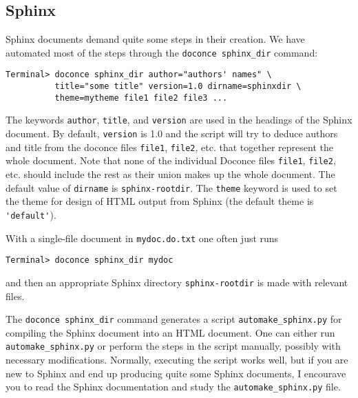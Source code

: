 \documentclass[%
oneside,                 %
final,                   %
10pt]{article}
\begin{document}
\noindent
\subsection{Sphinx}

Sphinx documents demand quite some steps in their creation. We have automated
most of the steps through the {\fontsize{10pt}{10pt}\Verb!doconce sphinx_dir!} command:
\vspace{4pt}
\begin{Verbatim}[numbers=none,frame=lines,label=\fbox{{\tiny Terminal}},fontsize=\fontsize{9pt}{9pt},
labelposition=topline,framesep=2.5mm,framerule=0.7pt]
Terminal> doconce sphinx_dir author="authors' names" \ 
          title="some title" version=1.0 dirname=sphinxdir \ 
          theme=mytheme file1 file2 file3 ...
\end{Verbatim}
The keywords {\fontsize{10pt}{10pt}\Verb!author!}, {\fontsize{10pt}{10pt}\Verb!title!}, and {\fontsize{10pt}{10pt}\Verb!version!} are used in the headings
of the Sphinx document. By default, {\fontsize{10pt}{10pt}\Verb!version!} is 1.0 and the script
will try to deduce authors and title from the doconce files {\fontsize{10pt}{10pt}\Verb!file1!},
{\fontsize{10pt}{10pt}\Verb!file2!}, etc. that together represent the whole document. Note that
none of the individual Doconce files {\fontsize{10pt}{10pt}\Verb!file1!}, {\fontsize{10pt}{10pt}\Verb!file2!}, etc. should
include the rest as their union makes up the whole document.
The default value of {\fontsize{10pt}{10pt}\Verb!dirname!} is {\fontsize{10pt}{10pt}\Verb!sphinx-rootdir!}. The {\fontsize{10pt}{10pt}\Verb!theme!}
keyword is used to set the theme for design of HTML output from
Sphinx (the default theme is {\fontsize{10pt}{10pt}\Verb!'default'!}).

With a single-file document in {\fontsize{10pt}{10pt}\Verb!mydoc.do.txt!} one often just runs
\vspace{4pt}
\begin{Verbatim}[numbers=none,frame=lines,label=\fbox{{\tiny Terminal}},fontsize=\fontsize{9pt}{9pt},
labelposition=topline,framesep=2.5mm,framerule=0.7pt]
Terminal> doconce sphinx_dir mydoc
\end{Verbatim}
and then an appropriate Sphinx directory {\fontsize{10pt}{10pt}\Verb!sphinx-rootdir!} is made with
relevant files.

The {\fontsize{10pt}{10pt}\Verb!doconce sphinx_dir!} command generates a script
{\fontsize{10pt}{10pt}\Verb!automake_sphinx.py!} for compiling the Sphinx document into an HTML
document.  One can either run {\fontsize{10pt}{10pt}\Verb!automake_sphinx.py!} or perform the
steps in the script manually, possibly with necessary modifications.
Normally, executing the script works well, but if you are new
to Sphinx and end up producing quite some Sphinx documents, I encourave
you to read the Sphinx documentation and study the {\fontsize{10pt}{10pt}\Verb!automake_sphinx.py!}
file.
\end{document}
